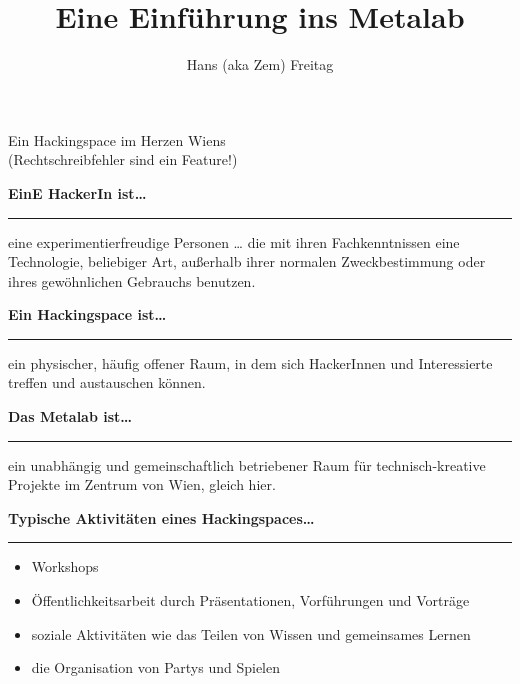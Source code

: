 \documentclass{seminar}
\title{Eine Einführung ins Metalab}
\author{ Hans (aka Zem) Freitag }
\providecommand{\T}[1]{
	\begin{center}
		{\bf #1}
	\end{center}
	\vspace{2mm}
	\hrule
	\vspace{2mm}
}
\begin{document}
\pagestyle{empty}
\centerslidestrue
\begin{slide}
	\maketitle
	\begin{center}
		Ein Hackingspace im Herzen Wiens\\
		{\sf (Rechtschreibfehler sind ein Feature!)}
	\end{center}
\end{slide}
\centerslidesfalse

\pagestyle{mypagestyle}

\begin{slide}
	\T{EinE HackerIn ist\ldots}
	eine experimentierfreudige Personen \ldots \pause
	die mit ihren Fachkenntnissen eine Technologie, beliebiger Art, außerhalb ihrer 
   normalen Zweckbestimmung oder ihres gewöhnlichen Gebrauchs benutzen.
\end{slide}

\begin{slide}
	\T{Ein Hackingspace ist\ldots}
	ein physischer, häufig offener Raum, in dem sich HackerInnen und Interessierte treffen 
	und austauschen können. \\ 
\end{slide}

\begin{slide}
	\T{Das Metalab ist\ldots}
	ein unabhängig und gemeinschaftlich betriebener Raum für technisch-kreative 
	Projekte im Zentrum von Wien, gleich hier.
\end{slide}

\begin{slide}
	\T{Typische Aktivitäten eines Hackingspaces\ldots}
	\begin{itemize}
		\item Workshops \pause
		\item Öffentlichkeitsarbeit durch Präsentationen, Vorführungen und Vorträge \pause
		\item soziale Aktivitäten wie das Teilen von Wissen und gemeinsames Lernen \pause
		\item die Organisation von Partys und Spielen \pause
	\end{itemize}
\end{slide}
\end{document}
